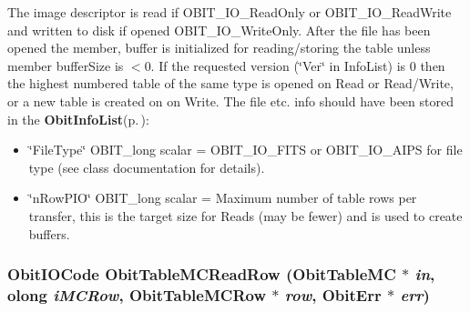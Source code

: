 The image descriptor is read if OBIT\_\-IO\_\-Read\-Only or OBIT\_\-IO\_\-Read\-Write and written to disk if opened OBIT\_\-IO\_\-Write\-Only. After the file has been opened the member, buffer is initialized for reading/storing the table unless member buffer\-Size is $<$0. If the requested version (\char`\"{}Ver\char`\"{} in Info\-List) is 0 then the highest numbered table of the same type is opened on Read or Read/Write, or a new table is created on on Write. The file etc. info should have been stored in the {\bf Obit\-Info\-List}{\rm (p.\,\pageref{structObitInfoList})}: \begin{itemize}
\item \char`\"{}File\-Type\char`\"{} OBIT\_\-long scalar = OBIT\_\-IO\_\-FITS or OBIT\_\-IO\_\-AIPS for file type (see class documentation for details). \item \char`\"{}n\-Row\-PIO\char`\"{} OBIT\_\-long scalar = Maximum number of table rows per transfer, this is the target size for Reads (may be fewer) and is used to create buffers. 
\end{itemize}
\subsubsection{\setlength{\rightskip}{0pt plus 5cm}Obit\-IOCode Obit\-Table\-MCRead\-Row ({\bf Obit\-Table\-MC} $\ast$ {\em in}, {\bf olong} {\em i\-MCRow}, {\bf Obit\-Table\-MCRow} $\ast$ {\em row}, {\bf Obit\-Err} $\ast$ {\em err})}\label{ObitTableMC_8h_a18}


